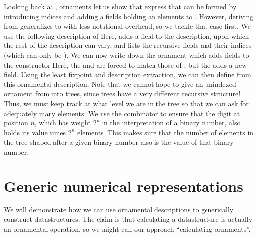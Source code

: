 Looking back at , ornaments let us show that express that  can be formed by introducing indices and adding a fields holding an elements to \bN{}.%
However, deriving  from \bN{} generalizes to \bL{} with less notational overhead, so we tackle that case first. We use the following description of \bN{}
Here,  adds a field to the description, upon which the rest of the description can vary, and  lists the recursive fields and their indices (which can only be ).
We can now write down the ornament which adds fields to the  constructor
Here, the  and  are forced to match those of ,
but the  adds a new field. Using the least fixpoint and description extraction, we can then define  from this ornamental description. Note that we cannot hope to give an unindexed ornament from \bL{}
into trees, since trees have a very different recursive structure! Thus, we must keep track at what level we are in the tree so that we can ask for adequately many elements:
We use the  combinator to ensure that the digit at position $n$, which has weight $2^n$ in the interpretation of a binary number, also holds its value times $2^n$ elements. This makes sure that the number of elements in the tree shaped after a given binary number also is the value of that  binary number.


\section{\added{}Generic numerical representations}\label{sec:trieo}
We will demonstrate how we can use ornamental descriptions to generically construct datastructures. The claim is that calculating a datastructure is actually an ornamental operation, so we might call our approach ``calculating ornaments''. 

